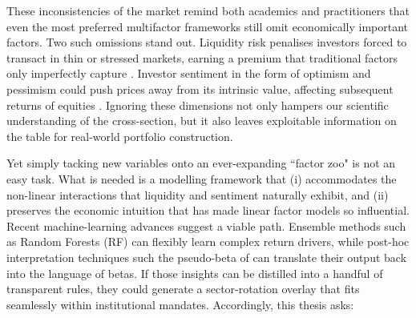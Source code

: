 
These inconsistencies of the market remind both academics and practitioners that even the most preferred multifactor frameworks still omit economically important factors. Two such omissions stand out. Liquidity risk penalises investors forced to transact in thin or stressed markets, earning a premium that traditional factors only imperfectly capture \cite{pastor_2003,acharya_2005}. Investor sentiment in the form of optimism and pessimism could push prices away from its intrinsic value, affecting subsequent returns of equities \cite{wurgler_2007}. Ignoring these dimensions not only hampers our scientific understanding of the cross-section, but it also leaves exploitable information on the table for real-world portfolio construction.

Yet simply tacking new variables onto an ever-expanding “factor zoo" is not an easy task. What is needed is a modelling framework that (i) accommodates the non-linear interactions that liquidity and sentiment naturally exhibit, and (ii) preserves the economic intuition that has made linear factor models so influential. Recent machine-learning advances suggest a viable path. Ensemble methods such as Random Forests (RF) can flexibly learn complex return drivers, while post-hoc interpretation techniques such the pseudo-beta of  can translate their output back into the language of betas. If those insights can be distilled into a handful of transparent rules, they could generate a sector-rotation overlay that fits seamlessly within institutional mandates. Accordingly, this thesis asks:

